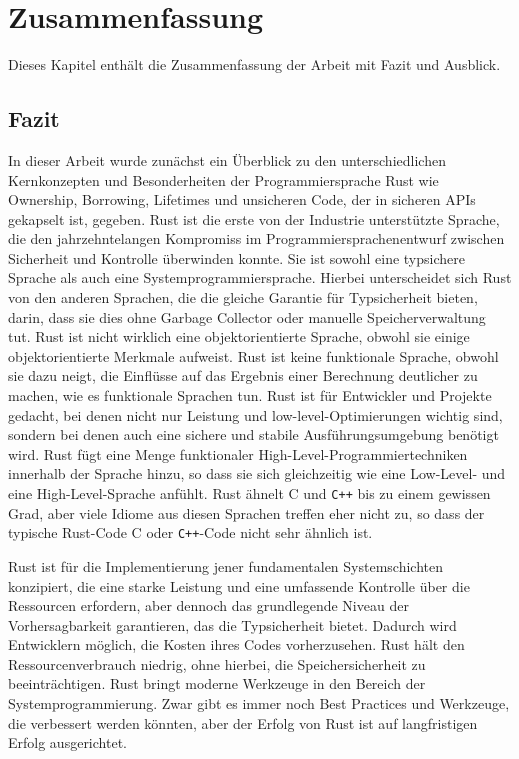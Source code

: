 \chapter{Zusammenfassung}

\nocite{*}

Dieses Kapitel enthält die Zusammenfassung der Arbeit mit Fazit und Ausblick.

\section{Fazit}

In dieser Arbeit wurde zunächst ein Überblick zu den unterschiedlichen Kernkonzepten und Besonderheiten der Programmiersprache Rust wie Ownership, Borrowing, Lifetimes und unsicheren Code, der in sicheren APIs gekapselt ist, gegeben. Rust ist die erste von der Industrie unterstützte Sprache, die den jahrzehntelangen Kompromiss im Programmiersprachenentwurf zwischen Sicherheit und Kontrolle überwinden konnte. Sie ist sowohl eine typsichere Sprache als auch eine Systemprogrammiersprache. Hierbei unterscheidet sich Rust von den anderen Sprachen, die die gleiche Garantie für Typsicherheit bieten, darin, dass sie dies ohne Garbage Collector oder manuelle Speicherverwaltung tut. Rust ist nicht wirklich eine objektorientierte Sprache, obwohl sie einige objektorientierte Merkmale aufweist. Rust ist keine funktionale Sprache, obwohl sie dazu neigt, die Einflüsse auf das Ergebnis einer Berechnung deutlicher zu machen, wie es funktionale Sprachen tun. Rust ist für Entwickler und Projekte gedacht, bei denen nicht nur Leistung und low-level-Optimierungen wichtig sind, sondern bei denen auch eine sichere und stabile Ausführungsumgebung benötigt wird. Rust fügt eine Menge funktionaler High-Level-Programmiertechniken innerhalb der Sprache hinzu, so dass sie sich gleichzeitig wie eine Low-Level- und eine High-Level-Sprache anfühlt. Rust ähnelt C und \texttt{C++} bis zu einem gewissen Grad, aber viele Idiome aus diesen Sprachen treffen eher nicht zu, so dass der typische Rust-Code C oder \texttt{C++}-Code nicht sehr ähnlich ist.

Rust ist für die Implementierung jener fundamentalen Systemschichten konzipiert, die eine starke Leistung und eine umfassende Kontrolle über die Ressourcen erfordern, aber dennoch das grundlegende Niveau der Vorhersagbarkeit garantieren, das die Typsicherheit bietet. Dadurch wird Entwicklern möglich, die Kosten ihres Codes vorherzusehen.
Rust hält den Ressourcenverbrauch niedrig, ohne hierbei, die Speichersicherheit zu beeinträchtigen. Rust bringt moderne Werkzeuge in den Bereich der Systemprogrammierung. Zwar gibt es immer noch Best Practices und Werkzeuge, die verbessert werden könnten, aber der Erfolg von Rust ist auf langfristigen Erfolg ausgerichtet.


